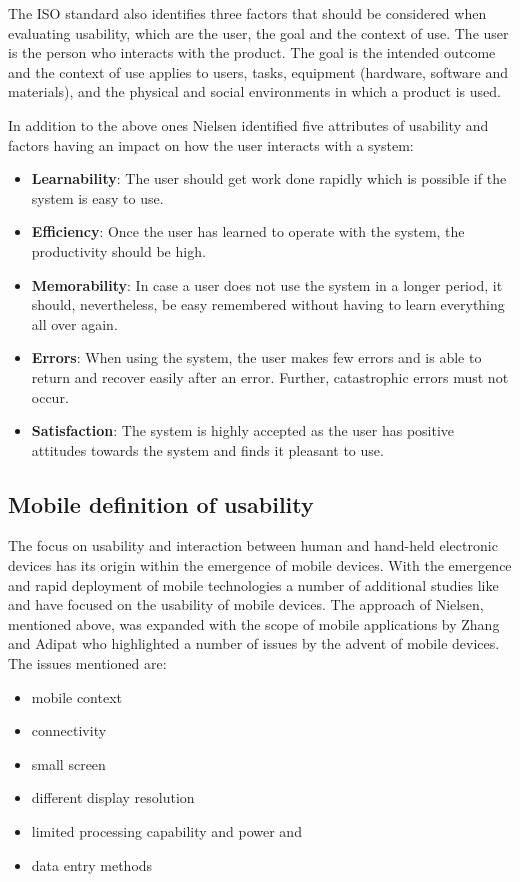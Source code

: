 The ISO standard also identifies three factors that should be considered when evaluating usability, which are the user, the goal and the context of use. The user is the person who interacts with the product. The goal is the intended outcome and the context of use applies to users, tasks, equipment (hardware, software and materials), and the physical and social environments in which a product is used.

In addition to the above ones Nielsen \cite{nielsen1994} identified five attributes of usability and factors having an impact on how the user interacts with a system: 

\begin{itemize}
	
	\item \textbf{Learnability}: The user should get work done rapidly which is possible if the system is easy to use.
	\item \textbf{Efficiency}: Once the user has learned to operate with the system, the productivity should be high.
	\item \textbf{Memorability}: In case a user does not use the system in a longer period, it should, nevertheless, be easy remembered without having to learn everything all over again.	
	\item \textbf{Errors}: When using the system, the user makes few errors and is able to return and recover easily after an error. Further, catastrophic errors must not occur.
	\item \textbf{Satisfaction}: The system is highly accepted as the user has positive attitudes towards the system and finds it pleasant to use.
\end{itemize}


\subsection{Mobile definition of usability}

The focus on usability and interaction between human and hand-held electronic devices has its origin within the emergence of mobile devices. With the emergence and rapid deployment of mobile technologies a number of additional studies like \cite{ryu2005development} and \cite{gafni2009usability} have focused on the usability of mobile devices. The approach of Nielsen, mentioned above, was expanded with the scope of mobile applications by Zhang and Adipat \cite{zhang2005challenges} who highlighted a number of issues by the advent of mobile devices. The issues mentioned are:
\begin{itemize}
	
	\item mobile context
	\item connectivity
	\item small screen
	\item different display resolution
	\item limited processing capability and power and
	\item data entry methods
	
\end{itemize}

